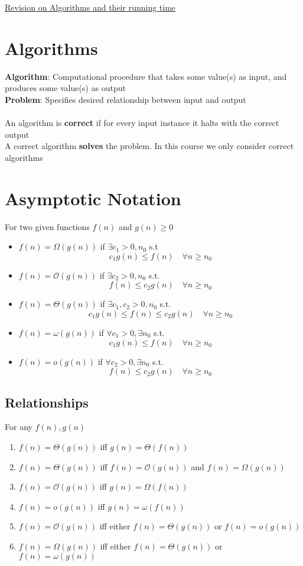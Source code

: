\documentclass{article}[18pt]
\begin{document}
\begin{center}
\underline{\huge Revision on Algorithms and their running time}
\end{center}
\section{Algorithms}
\textbf{Algorithm}: Computational procedure that takes some value(s) as input, and produces some value(s) as output\\
\textbf{Problem}: Specifies desired relationship between input and output\\
\\
An algorithm is \textbf{correct} if for every input instance it halts with the correct output\\
A correct algorithm \textbf{solves} the problem. In this course we only consider correct algorithms
\section{Asymptotic Notation}
For two given functions $f(n)$ and $g(n)\geqslant 0$
\begin{itemize}
	\item $f(n)=\Omega(g(n))$ if $\exists c_1 > 0, n_0$ s.t
	\[
	c_{1} g(n) \leq f(n) \quad \forall n \geq n_{0}
	\]
	\item $f(n) = \mathcal{O}(g(n))$ if $\exists c_2 >0, n_0$ s.t.
	\[
	f(n) \leq c_{2} g(n) \quad \forall n \geq n_{0}
	\]
	\item $f(n) = \Theta(g(n))$ if $\exists c_1,c_2 >0, n_0$ s.t.
	\[
	c_{1} g(n) \leq f(n) \leq c_{2} g(n) \quad \forall n \geq n_{0}
	\]
	\item $f(n) = \omega(g(n))$ if $\forall c_1 > 0, \exists n_0$ s.t.
	\[
	c_{1} g(n) \leq f(n) \quad \forall n \geq n_{0}
	\]
	\item $f(n)=o(g(n))$ if $\forall c_2 >0, \exists n_0$ s.t.
	\[
	f(n) \leq c_{2} g(n) \quad \forall n \geq n_{0}
	\]
\end{itemize}
\subsection{Relationships}
For any $f(n), g(n)$
\begin{enumerate}
	\item $f(n)=\Theta(g(n))$ iff $g(n)=\Theta(f(n))$
	\item $f(n) = \Theta(g(n))$ iff $f(n)=\mathcal{O}(g(n))$ and $f(n)=\Omega(g(n))$
	\item $f(n)=\mathcal{O}(g(n))$ iff $g(n)=\Omega(f(n))$
	\item $f(n)=o(g(n))$ iff $g(n)=\omega(f(n))$
	\item $f(n)=\mathcal{O}(g(n))$ iff either $f(n)=\Theta(g(n))$ or $f(n)=o(g(n))$
	\item $f(n)=\Omega(g(n))$ iff either $f(n)=\Theta(g(n))$ or $f(n)=\omega(g(n))$
\end{enumerate}
\end{document}

